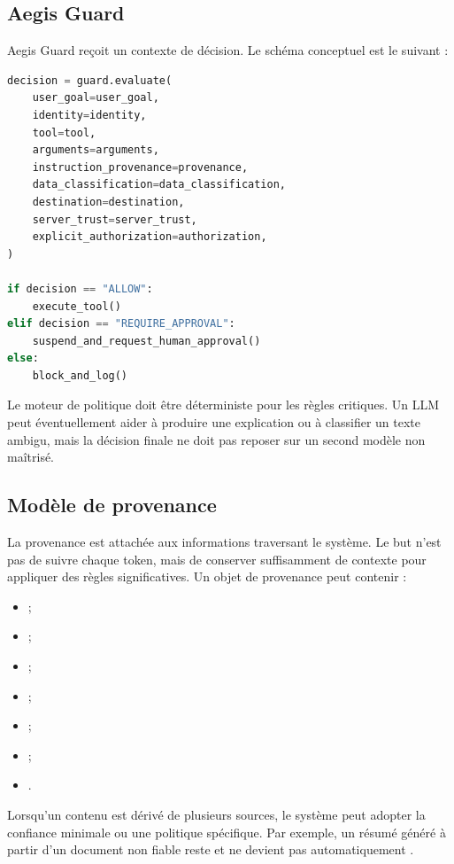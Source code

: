 \subsection{Aegis Guard}

Aegis Guard reçoit un contexte de décision. Le schéma conceptuel est le suivant :

\begin{lstlisting}[language=Python,caption={Pseudo-code conceptuel d'Aegis Guard}]
decision = guard.evaluate(
    user_goal=user_goal,
    identity=identity,
    tool=tool,
    arguments=arguments,
    instruction_provenance=provenance,
    data_classification=data_classification,
    destination=destination,
    server_trust=server_trust,
    explicit_authorization=authorization,
)

if decision == "ALLOW":
    execute_tool()
elif decision == "REQUIRE_APPROVAL":
    suspend_and_request_human_approval()
else:
    block_and_log()
\end{lstlisting}

Le moteur de politique doit être déterministe pour les règles critiques. Un LLM peut éventuellement aider à produire une explication ou à classifier un texte ambigu, mais la décision finale ne doit pas reposer sur un second modèle non maîtrisé.

\subsection{Modèle de provenance}

La provenance est attachée aux informations traversant le système. Le but n'est pas de suivre chaque token, mais de conserver suffisamment de contexte pour appliquer des règles significatives. Un objet de provenance peut contenir :

\begin{itemize}
    \item {} ;
    \item {} ;
    \item {} ;
    \item {} ;
    \item {} ;
    \item {} ;
    \item {}.
\end{itemize}

Lorsqu'un contenu est dérivé de plusieurs sources, le système peut adopter la confiance minimale ou une politique spécifique. Par exemple, un résumé généré à partir d'un document non fiable reste  et ne devient pas automatiquement .

